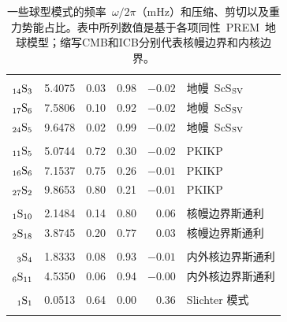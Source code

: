{\begin{table}
\begin{tabular}{|r|r|c|c|r|l|}
& & & & & \\
${}_{14}{\rm S}_3$\hspace{1.7 mm} & 5.4075 & 0.03 & 0.98 & $-0.02$ & 地幔~ScS${}_{\rm SV}$ \\
${}_{17}{\rm S}_6$\hspace{1.7 mm} & 7.5806 & 0.10 & 0.92 & $-0.02$ & 地幔~ScS${}_{\rm SV}$ \\
${}_{24}{\rm S}_5$\hspace{1.7 mm} & 9.6478 & 0.02 & 0.99 & $-0.02$ & 地幔~ScS${}_{\rm SV}$ \\
& & & & & \\
${}_{11}{\rm S}_5$\hspace{1.7 mm} & 5.0744 & 0.72 & 0.30 & $-0.02$ & PKIKP \\
${}_{16}{\rm S}_6$\hspace{1.7 mm} & 7.1537 & 0.75 & 0.26 & $-0.01$ & PKIKP \\
${}_{27}{\rm S}_2$\hspace{1.7 mm} & 9.8653 & 0.80 & 0.21 & $-0.01$ & PKIKP \\
& & & & & \\
${}_1{\rm S}_{10}$\hspace{0.4 mm} & 2.1484 & 0.14 & 0.80 & 0.06 & 核幔边界斯通利 \\
${}_2{\rm S}_{18}$\hspace{0.4 mm} & 3.8745 & 0.20 & 0.77 & 0.03 & 核幔边界斯通利 \\
& & & & & \\
${}_3{\rm S}_4$\hspace{1.7 mm} & 1.8333 & 0.08 & 0.93 & $-0.01$ & 内外核边界斯通利 \\
${}_6{\rm S}_{11}$\hspace{0.4 mm} & 4.5350 & 0.06 & 0.94 & $-0.00$ & 内外核边界斯通利 \\
& & & & & \\
${}_1{\rm S}_1$\hspace{1.5 mm} & 0.0513 & 0.64 & 0.00 & 0.36 & Slichter 模式 \\
& & & & & \\ \hline
\end{tabular}
\caption[modeenergy]{
一些球型模式的频率~$\omega/2\pi$（mHz）和压缩、剪切以及重力势能占比。表中所列数值是基于各项同性~PREM~地球模型；缩写CMB和ICB分别代表核幔边界和内核边界。
}
\label{table:modenergy}
\end{table}

}
